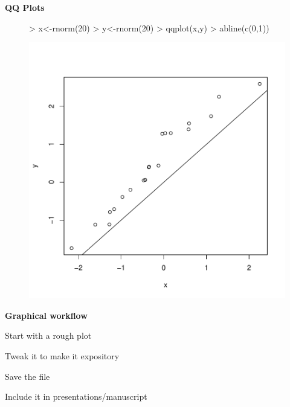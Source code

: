 \documentclass[xcolor=dvipsnames , 11pt]{beamer}
\begin{document}
\begin{frame}[fragile]{\textbf{QQ Plots}}

\begin{center}
\begin{figure}
\centering
\begin{Schunk}
\begin{Sinput}
> x<-rnorm(20)
> y<-rnorm(20)
> qqplot(x,y)
> abline(c(0,1))
\end{Sinput}
\end{Schunk}
\includegraphics{lesson1_graphs_presentation-008}
\end{figure}
\end{center}

\end{frame}

\begin{frame}{\textbf{Graphical workflow}}

\begin{itemize}
\begin{pause}
\item{Start with a rough plot}
\end{pause}
\begin{pause}
\item{Tweak it to make it expository}
\end{pause}
\begin{pause}
\item{Save the file}
\end{pause}
\begin{pause}
\item{Include it in presentations/manuscript}
\end{pause}
\end{itemize}
\end{frame}
\end{document}
